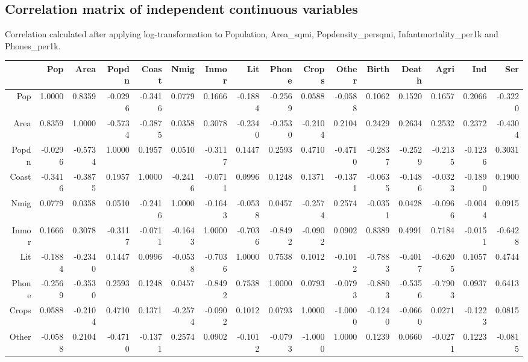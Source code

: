 \documentclass[12pt,a4paper]{article}
\renewcommand\texttt[1]{{\ttfamily\color{ttcolor}#1}}
\begin{document}
\pagebreak
\begin{landscape}
\subsection{Correlation matrix of independent continuous variables}
Correlation calculated after applying log-transformation to \texttt{Population}, \texttt{Area\_sqmi}, \texttt{Popdensity\_persqmi}, \texttt{Infantmortality\_per1k} and \texttt{Phones\_per1k}.
\begin{table}[ht]
\small
\centering
\begin{tabular}{r|rrrrrrrrrrrrrrr}
  \hline
  & Pop & Area & Popdn & Coast & Nmig & Inmor & Lit & Phone & Crops & Other & Birth & Death & Agri & Ind & Ser \\
\hline
Pop & 1.0000 & 0.8359 & -0.0296 & -0.3416 & 0.0779 & 0.1666 & -0.1884 & -0.2569 & 0.0588 & -0.0588 & 0.1062 & 0.1520 & 0.1657 & 0.2066 & -0.3220 \\ 
  Area & 0.8359 & 1.0000 & -0.5734 & -0.3875 & 0.0358 & 0.3078 & -0.2340 & -0.3530 & -0.2104 & 0.2104 & 0.2429 & 0.2634 & 0.2532 & 0.2372 & -0.4304 \\ 
  Popdn & -0.0296 & -0.5734 & 1.0000 & 0.1957 & 0.0510 & -0.3117 & 0.1447 & 0.2593 & 0.4710 & -0.4710 & -0.2837 & -0.2529 & -0.2135 & -0.1236 & 0.3031 \\ 
  Coast & -0.3416 & -0.3875 & 0.1957 & 1.0000 & -0.2416 & -0.0711 & 0.0996 & 0.1248 & 0.1371 & -0.1371 & -0.0635 & -0.1486 & -0.0323 & -0.1890 & 0.1900 \\ 
  Nmig & 0.0779 & 0.0358 & 0.0510 & -0.2416 & 1.0000 & -0.1643 & -0.0538 & 0.0457 & -0.2574 & 0.2574 & -0.0351 & 0.0428 & -0.0966 & -0.0044 & 0.0915 \\ 
  Inmor & 0.1666 & 0.3078 & -0.3117 & -0.0711 & -0.1643 & 1.0000 & -0.7036 & -0.8492 & -0.0902 & 0.0902 & 0.8389 & 0.4991 & 0.7184 & -0.0151 & -0.6428 \\ 
  Lit & -0.1884 & -0.2340 & 0.1447 & 0.0996 & -0.0538 & -0.7036 & 1.0000 & 0.7538 & 0.1012 & -0.1012 & -0.7883 & -0.4017 & -0.6205 & 0.1057 & 0.4744 \\ 
  Phone & -0.2569 & -0.3530 & 0.2593 & 0.1248 & 0.0457 & -0.8492 & 0.7538 & 1.0000 & 0.0793 & -0.0793 & -0.8803 & -0.5356 & -0.7903 & 0.0937 & 0.6413 \\ 
  Crops & 0.0588 & -0.2104 & 0.4710 & 0.1371 & -0.2574 & -0.0902 & 0.1012 & 0.0793 & 1.0000 & -1.0000 & -0.1240 & -0.0660 & 0.0271 & -0.1223 & 0.0815 \\ 
  Other & -0.0588 & 0.2104 & -0.4710 & -0.1371 & 0.2574 & 0.0902 & -0.1012 & -0.0793 & -1.0000 & 1.0000 & 0.1239 & 0.0660 & -0.0271 & 0.1223 & -0.0815 \\ 

\end{tabular}
\end{table}
\end{landscape}
\end{document}
